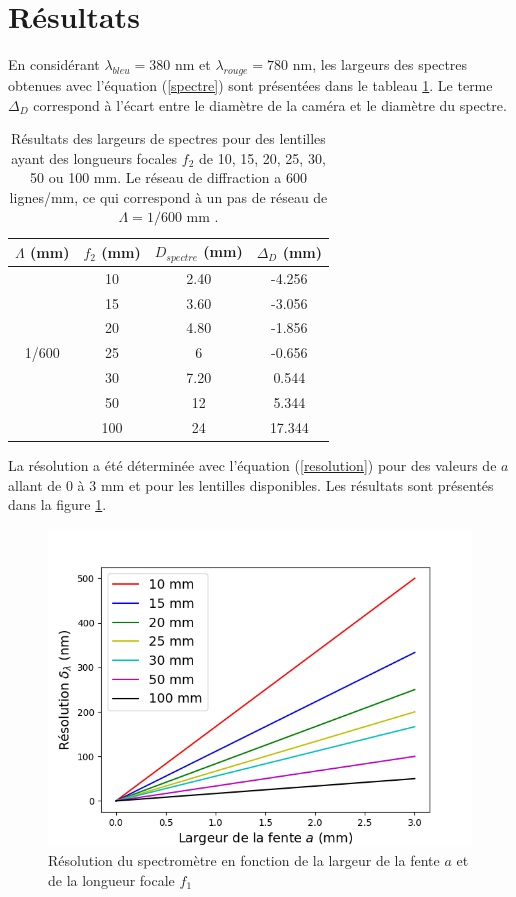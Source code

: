 \documentclass[conference]{IEEEtran}
\begin{document}
\section{Résultats \label{resultats}}
En considérant $\lambda_{bleu}=380$ nm et $\lambda_{rouge}=780$ nm, les largeurs des spectres obtenues avec l'équation (\ref{spectre}) sont présentées
dans le tableau \ref{largeur_spectre}. Le terme $\Delta_D$ correspond à l'écart entre le diamètre de la caméra et le diamètre du spectre.
\begin{table}[H]
    \caption{Résultats des largeurs de spectres pour des lentilles ayant des longueurs focales
    $f_2$ de 10, 15, 20, 25, 30, 50 ou 100 mm. Le réseau de diffraction a 600 lignes/mm, ce qui correspond à un pas de réseau
    de $\Lambda=1/600$ mm \cite{grating}.}    
    \centering
    \begin{tabular}{c|c|c|c}
    $\Lambda$ (mm) & $f_2$ (mm) & $D_{spectre}$ (mm) & $\Delta_D$ (mm) \\
    \hline
    \hline
    \multirow{7}{*}{1/600} & 10 & 2.40 & -4.256 \\
    & 15 & 3.60 & -3.056 \\
    & 20 & 4.80 & -1.856 \\
    & 25 & 6 & -0.656 \\
    & 30 & 7.20 & 0.544 \\
    & 50 & 12 & 5.344 \\
    & 100 & 24 & 17.344\\
    \hline
    \end{tabular}
    \label{largeur_spectre}
\end{table}
La résolution a été déterminée avec l'équation (\ref{resolution}) pour des valeurs de $a$ allant de 0 à 3 mm et pour les lentilles
disponibles. Les résultats sont présentés dans la figure \ref{res}.
\begin{figure}[H]
    \centering
    \includegraphics[scale=0.5]{Resolution.png}
    \caption{Résolution du spectromètre en fonction de la largeur de la fente $a$ et de la longueur focale $f_1$}
    \label{res}
\end{figure}
\end{document}
